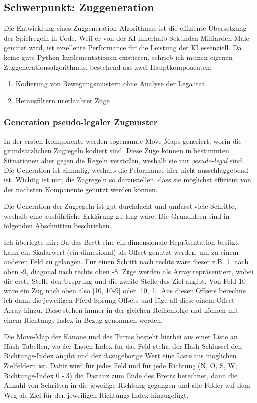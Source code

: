 \documentclass{jpp}
\begin{document}
\subsection{Schwerpunkt: Zuggeneration}\label{subsec:zuggeneration}
Die Entwicklung eines Zuggeneration-Algorithmus ist die effiziente Übersetzung der Spielregeln in Code. Weil er von der KI innerhalb Sekunden Milliarden Male genutzt wird, ist exzellente 
Performance für die Leistung der KI essenziell. Da keine gute Python-Implementationen existieren, schrieb ich meinen eigenen Zuggenerationsalgorithmus, bestehend aus zwei Hauptkomponenten:
\begin{enumerate}
    \item Kodierung von Bewegungsmustern ohne Analyse der Legalität
    \item Herausfiltern unerlaubter Züge
\end{enumerate}

\subsubsection{Generation pseudo-legaler Zugmuster}
In der ersten Komponente werden sogenannte Move-Maps generiert, worin die grundsätzlichen Zugregeln kodiert sind. Diese Züge können in bestimmten Situationen aber gegen die 
Regeln verstoßen, weshalb sie nur \textit{pesudo-legal} sind. Die Generation ist einmalig, weshalb die Peformance hier nicht ausschlaggebend ist. Wichtig ist nur, die Zugregeln so darzustellen, dass sie möglichst effizient von der nächsten Komponente genutzt werden können.

Die Generation der Zugregeln ist gut durchdacht und umfasst viele Schritte, weshalb eine ausführliche Erklärung zu lang wäre. Die Grundideen sind in folgenden Abschnitten beschrieben.

Ich überlegte mir: Da das Brett eine ein-dimensionale Repräsentation besitzt, kann ein Skalarwert (ein-dimesional) als Offset genutzt werden, um zu einem anderen Feld zu gelangen. Für einen Schritt nach rechts wäre dieser z.B. 1, nach oben -9, diagonal nach rechts oben -8. Züge werden als Array repräsentiert, wobei die erste Stelle den Ursprung und die zweite Stelle das Ziel angibt. Von Feld 10 wäre ein Zug nach oben also [10, 10-9] oder [10, 1]. Aus diesen Offsets berechne ich dann die jeweiligen Pferd-Sprung Offsets und füge all diese einem Offset-Array hinzu. Diese stehen immer in der gleichen Reihenfolge und können mit einem Richtungs-Index in Bezug genommen werden.

Die Move-Map der Kanone und des Turms besteht hierbei aus einer Liste an Hash-Tabellen, wo der Listen-Index für das Feld steht, der  Hash-Schlüssel den Richtungs-Index angibt und der dazugehörige Wert eine Liste aus möglichen Zielfeldern ist. Dafür wird für jedes Feld und für jede Richtung (N, O, S, W; Richtungs-Index 0 - 3) die Distanz zum Ende des Bretts berechnet, dann die Anzahl von Schritten in die jeweilige Richtung  gegangen und alle Felder auf dem Weg als Ziel für den jeweiligen Richtungs-Index hinzugefügt.
\end{document}
